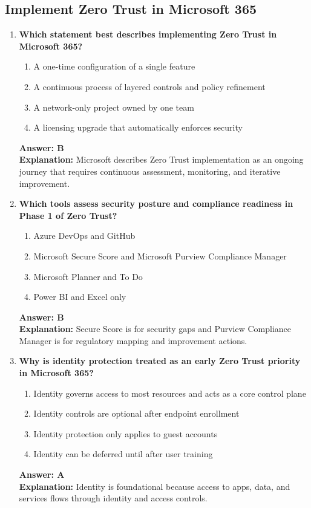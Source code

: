 \documentclass[10pt]{article}
\begin{document}
\begin{enumerate}[leftmargin=*]
\end{enumerate}

\clearpage

\subsection{Implement Zero Trust in Microsoft 365}
\begin{enumerate}[leftmargin=*]

\item \textbf{Which statement best describes implementing Zero Trust in Microsoft 365?}
\begin{enumerate}[label=\Alph*.]
  \item A one-time configuration of a single feature
  \item A continuous process of layered controls and policy refinement
  \item A network-only project owned by one team
  \item A licensing upgrade that automatically enforces security
\end{enumerate}
\textbf{Answer: B}\\
\textbf{Explanation:} Microsoft describes Zero Trust implementation as an ongoing journey that requires continuous assessment, monitoring, and iterative improvement.

\item \textbf{Which tools assess security posture and compliance readiness in Phase 1 of Zero Trust?}
\begin{enumerate}[label=\Alph*.]
  \item Azure DevOps and GitHub
  \item Microsoft Secure Score and Microsoft Purview Compliance Manager
  \item Microsoft Planner and To Do
  \item Power BI and Excel only
\end{enumerate}
\textbf{Answer: B}\\
\textbf{Explanation:} Secure Score is for security gaps and Purview Compliance Manager is for regulatory mapping and improvement actions.

\item \textbf{Why is identity protection treated as an early Zero Trust priority in Microsoft 365?}
\begin{enumerate}[label=\Alph*.]
  \item Identity governs access to most resources and acts as a core control plane
  \item Identity controls are optional after endpoint enrollment
  \item Identity protection only applies to guest accounts
  \item Identity can be deferred until after user training
\end{enumerate}
\textbf{Answer: A}\\
\textbf{Explanation:} Identity is foundational because access to apps, data, and services flows through identity and access controls.


\end{enumerate}
\end{document}
